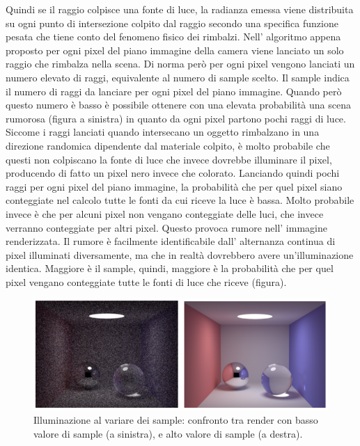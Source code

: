 Quindi se il raggio colpisce una fonte di luce, la radianza emessa viene distribuita su ogni punto di intersezione colpito dal raggio secondo una specifica funzione pesata che tiene conto del fenomeno fisico dei rimbalzi. 
Nell’ algoritmo appena proposto per ogni pixel del piano immagine della camera viene lanciato un solo raggio che rimbalza nella scena. Di norma però per ogni pixel vengono lanciati un numero elevato di raggi, equivalente al numero di sample scelto. Il sample indica il numero di raggi da lanciare per ogni pixel del piano immagine.
Quando però questo numero è basso è possibile ottenere con una elevata probabilità una scena rumorosa (figura a sinistra) in quanto da ogni pixel partono pochi raggi di luce. 
Siccome i raggi lanciati quando intersecano un oggetto rimbalzano in una direzione randomica dipendente dal materiale colpito, è molto probabile che questi non colpiscano la fonte di luce che invece dovrebbe illuminare il pixel, producendo di fatto un pixel nero invece che colorato. 
Lanciando quindi pochi raggi per ogni pixel del piano immagine, la probabilità che per quel pixel siano conteggiate nel calcolo tutte le fonti da cui riceve la luce è bassa. 
Molto probabile invece è che per alcuni pixel non vengano conteggiate delle luci, che invece verranno conteggiate per altri pixel. Questo provoca rumore nell’ immagine renderizzata. 
Il rumore è facilmente identificabile dall’ alternanza continua di pixel illuminati diversamente, ma che in realtà dovrebbero avere un’illuminazione identica.
Maggiore è il sample, quindi, maggiore è la probabilità che per quel pixel vengano conteggiate tutte le fonti di luce che riceve (figura).
\\
\begin{figure}[htb]
 \centering
 \includegraphics[width=0.8\linewidth]{images/chapter_stato_arte/stato_arte_effetto_sampling.png}\hfill
 \caption[Illuminazione al variare dei sample]{Illuminazione al variare dei sample: confronto tra render con basso valore di sample (a sinistra), e alto valore di sample (a destra).}
 \label{fig:stato_arte_effetto_sampling}
\end{figure}

